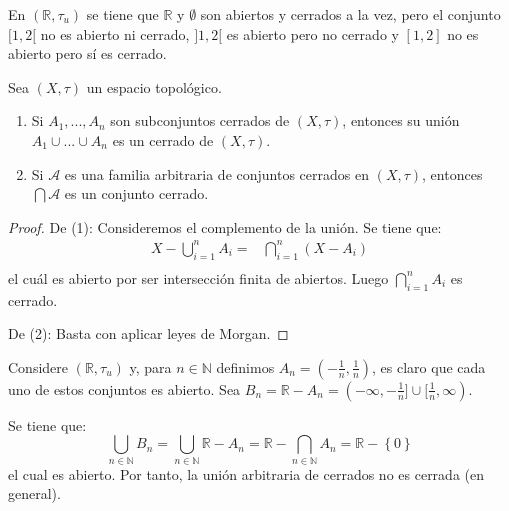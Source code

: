 \documentclass[12pt]{report}
\theoremstyle{largebreak}
\begin{document}
    \begin{exa}
        En $(\mathbb{R},\tau_u)$ se tiene que $\mathbb{R}$ y $\emptyset$ son abiertos y cerrados a la vez, pero el conjunto $[1,2[$ no es abierto ni cerrado, $]1,2[$ es abierto pero no cerrado y $[1,2]$ no es abierto pero sí es cerrado.
    \end{exa}

    \begin{propo}
        Sea $(X,\tau)$ un espacio topológico.
        \begin{enumerate}
            \item Si $A_1,...,A_n$ son subconjuntos cerrados de $(X,\tau)$, entonces su unión $A_1\cup...\cup A_n$ es un cerrado de $(X,\tau)$.
            \item Si $\mathcal{A}$ es una familia arbitraria de conjuntos cerrados en $(X,\tau)$, entonces $\bigcap\mathcal{A}$ es un conjunto cerrado.
        \end{enumerate}
    \end{propo}

    \begin{proof}
        De (1): Consideremos el complemento de la unión. Se tiene que:
        \begin{equation*}
            \begin{split}
                X-\bigcup_{i=1}^nA_i=&\bigcap_{i=1}^n(X-A_i)\\
            \end{split}
        \end{equation*}
        el cuál es abierto por ser intersección finita de abiertos. Luego $\bigcap_{i=1}^nA_i$ es cerrado.

        De (2): Basta con aplicar leyes de Morgan.
    \end{proof}

    \begin{exa}
        Considere $(\mathbb{R},\tau_u)$ y, para $n\in\mathbb{N}$ definimos $A_n=(-\frac{1}{n},\frac{1}{n})$, es claro que cada uno de estos conjuntos es abierto. Sea $B_n=\mathbb{R}-A_n=(-\infty,-\frac{1}{n}]\cup[\frac{1}{n},\infty)$.

        Se tiene que:
        \begin{equation*}
            \bigcup_{n\in\mathbb{N}}B_n=\bigcup_{n\in\mathbb{N}}\mathbb{R}-A_n=\mathbb{R}-\bigcap_{n\in\mathbb{N}}A_n=\mathbb{R}-\left\{0\right\}
        \end{equation*}
        el cual es abierto. Por tanto, la unión arbitraria de cerrados no es cerrada (en general).
    \end{exa}
\end{document}
